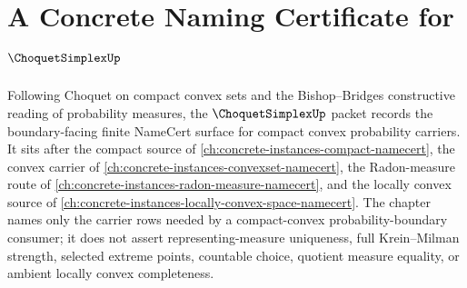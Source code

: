 \chapter{A Concrete Naming Certificate for $\ChoquetSimplexUp$}
\label{ch:concrete-instances-choquet-simplex-namecert}

Following Choquet on compact convex sets and the Bishop--Bridges constructive reading of probability measures, the $\ChoquetSimplexUp$ packet records the boundary-facing finite NameCert surface for compact convex probability carriers. It sits after the compact source of \autoref{ch:concrete-instances-compact-namecert}, the convex carrier of \autoref{ch:concrete-instances-convexset-namecert}, the Radon-measure route of \autoref{ch:concrete-instances-radon-measure-namecert}, and the locally convex source of \autoref{ch:concrete-instances-locally-convex-space-namecert}. The chapter names only the carrier rows needed by a compact-convex probability-boundary consumer; it does not assert representing-measure uniqueness, full Krein--Milman strength, selected extreme points, countable choice, quotient measure equality, or ambient locally convex completeness.


